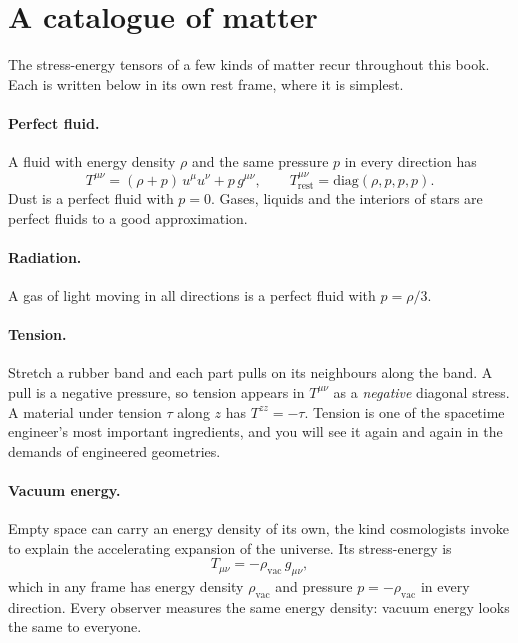 \section{A catalogue of matter}\label{sec:catalogue}

The stress-energy tensors of a few kinds of matter recur throughout this book.
Each is written below in its own rest frame, where it is simplest.

\paragraph{Perfect fluid.} A fluid with energy density $\rho$ and the same
pressure $p$ in every direction has
\begin{equation}
  T^{\mu\nu} = (\rho + p)\,u^{\mu}u^{\nu} + p\,g^{\mu\nu},
  \qquad
  T^{\mu\nu}_{\text{rest}} = \mathrm{diag}(\rho, p, p, p).
  \label{eq:perfect-fluid}
\end{equation}
Dust is a perfect fluid with $p = 0$. Gases, liquids and the interiors of stars
are perfect fluids to a good approximation.

\paragraph{Radiation.} A gas of light moving in all directions is a perfect
fluid with $p = \rho/3$.

\paragraph{Tension.} Stretch a rubber band and each part pulls on its
neighbours along the band. A pull is a negative pressure, so tension appears in
$T^{\mu\nu}$ as a \emph{negative} diagonal stress. A material under tension
$\tau$ along $z$ has $T^{zz} = -\tau$. Tension is one of the spacetime engineer's
most important ingredients, and you will see it again and again in the demands
of engineered geometries.

\paragraph{Vacuum energy.} Empty space can carry an energy density of its own,
the kind cosmologists invoke to explain the accelerating expansion of the
universe. Its stress-energy is
\begin{equation}
  T_{\mu\nu} = -\rho_{\text{vac}}\,g_{\mu\nu},
  \label{eq:vacuum-energy}
\end{equation}
which in any frame has energy density $\rho_{\text{vac}}$ and pressure
$p = -\rho_{\text{vac}}$ in every direction. Every observer measures the same
energy density: vacuum energy looks the same to everyone.


